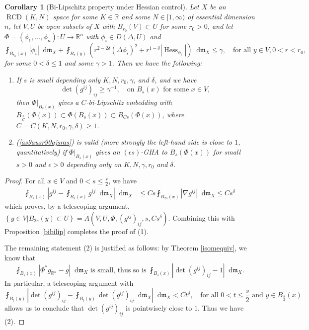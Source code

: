 \documentclass[11pt,reqno]{amsart}
\newtheorem{corollary}[theorem]{Corollary}
\theoremstyle{definition}
\numberwithin{equation}{section}
\newcommand{\di}{\mathop{}\!\mathrm{d}}
\newcommand{\meas}{\mathfrak{m}}
\DeclareMathOperator{\Hess}{Hess}
\DeclareMathOperator{\RCD}{RCD}
\begin{document}
\begin{corollary}[Bi-Lipschitz property under Hessian control]\label{bilipchart}
Let $X$ be an $\RCD(K, N)$ space for some $K \in \mathbb{R}$ and some $N \in [1, \infty)$ of essential dimension $n$, 
let $V, U$ be open subsets of $X$ with $B_{r_0}(V) \subset U$ for some $r_0>0$, and 
     let $\Phi=(\phi_1, \ldots, \phi_n):U\to \mathbb{R}^n$ with
    $\phi_i \in D(\Delta, U)$ and 
    \begin{equation*}
        \fint_{B_{r_0}(x)}|\phi_i|\di \meas_X+\fint_{B_r(y)}\left(r^{2-2\delta}(\Delta \phi_i)^2+r^{1-\delta}|\Hess_{\phi_i}|\right)\di \meas_X \le \gamma,\quad \text{for all $y \in V, 0<r<r_0$,}
    \end{equation*}
    for some $0<\delta \le 1$ and some $\gamma>1$. Then we have the following:
    \begin{enumerate}
        \item If $s$ is small depending only $K, N, r_0, \gamma$, and $\delta$, and we have 
\begin{equation}\label{as9ausr90ajsras}
     \det(g^{ij})_{ij} \ge \gamma^{-1},\quad \text{on $B_s(x)$ for some $x \in V$},
\end{equation} then $\Phi|_{B_s(x)}$ gives a $C$-bi-Lipschitz embedding with
$
B_{\frac{s}{C}}(\Phi (x))\subset \Phi(B_s(x)) \subset B_{Cs}(\Phi(x))$, where $C=C(K, N, r_0, \gamma, \delta) \ge 1$.
        \item (\ref{as9ausr90ajsras}) is valid (more strongly the left-hand side is close to $1$, quantitatively) if $\Phi|_{B_s(x)}$ gives an $(\epsilon s)$-GHA to $B_s(\Phi(x))$ for small $s>0$ and $\epsilon>0$ depending only on $K, N, \gamma, r_0$ and $\delta$.
    \end{enumerate}
\end{corollary}
\begin{proof}
For all $x \in V$ and $0<s \le \frac{r}{2}$, we have 
\begin{align}
\fint_{B_s(x)} \left| g^{i j} - \fint_{B_s(x)}g^{i j} \di \meas_X\right|\di \meas_X &\le Cs \fint_{B_{2s}(x)}|\nabla g^{i j}| \di \meas_X \le Cs^{\delta} 
\end{align}
which proves, by a telescoping argument,
$
\left\{y \in V | B_{2s}(y)\subset U \right\}=\tilde A(V, U, \Phi, (g^{ij})_{ij}, s, Cs^{\delta}).
$
Combining this with Proposition \ref{bibilip} completes the proof of (1). 

The remaining statement (2) is justified as follows:
by Theorem \ref{isomequiv}, we know that 
$$
\text{$\fint_{B_s(x)}\left|\Phi^*g_{\mathbb{R}^n}-g \right|\di \meas_X$ is small, thus so is $\fint_{B_s(x)}\left| \det(g^{ij})_{ij} -1\right|\di \meas_X$.}
$$
In particular,
     a telescoping argument with
    \begin{equation}
        \fint_{B_t(y)}\left| \det(g^{ij})_{ij} -\fint_{B_t(y)}\det(g^{ij})_{ij}\di \meas_X\right|\di \meas_X<Ct^{\delta},\quad \text{for all $0<t \le \frac{s}{2}$ and $y \in B_{\frac{s}{2}}(x)$}
    \end{equation}
    allows us to conclude that $\det(g^{ij})_{ij}$ is pointwisely close to $1$. Thus we have (2). 
\end{proof}
\end{document}
